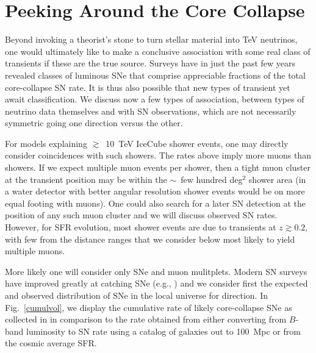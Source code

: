\documentclass[aps,prd,nofootinbib,twocolumn,floatfix,letterpaper,superscriptaddress,showpacs]{revtex4}
\begin{document}
\section{Peeking Around the Core Collapse}
\label{purpose}
%
Beyond invoking a theorist's stone to turn stellar material into TeV neutrinos, one would ultimately like to make a conclusive association with some real class of transients if these are the true source.  Surveys have in just the past few years revealed classes of luminous SNe that comprise appreciable fractions of the total core-collapse SN rate.  It is thus also possible that new types of transient yet await classification.  We discuss now a few types of association, between types of neutrino data themselves and with SN observations, which are not necessarily symmetric going one direction versus the other.

For models explaining $\gtrsim$~10~TeV IceCube shower events, one may directly consider coincidences with such showers.  The rates above imply more muons than showers.  If we expect multiple muon events per shower, then a tight muon cluster at the transient position may be within the $\sim$~few hundred deg$^2$ shower area (in a water detector with better angular resolution shower events would be on more equal footing with muons).  One could also search for a later SN detection at the position of any such muon cluster and we will discuss observed SN rates.  However, for SFR evolution, most shower events are due to transients at $z \!\gtrsim\! 0.2$, with few from the distance ranges that we consider below most likely to yield multiple muons.

More likely one will consider only SNe and muon mulitplets.  Modern SN surveys have improved greatly at catching SNe (e.g., \cite{Kasliwal:2010cu,Djorgovski:2011iy,Lipunov:2009ck,Baltay2013,Shappee:2013mna,Smartt:2014rpa}) and we consider first the expected and observed distribution of SNe in the local universe for direction.
In Fig.~\ref{cumulvol}, we display the cumulative rate of likely core-collapse SNe as collected in \cite{SNcat} in comparison to the rate obtained from either converting from $B$-band luminosity to SN rate \cite{Li:2010kd} using a catalog of galaxies out to 100~Mpc \cite{White:2011qf} or from the cosmic average SFR.
\end{document}
